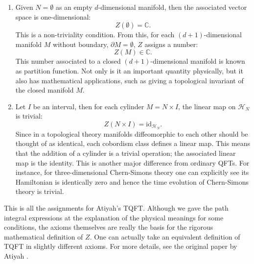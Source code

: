 \begin{enumerate}
  \item Given $N=\emptyset$ as an empty $d$-dimensional manifold, then the
associated vector space is one-dimensional:
\begin{equation}
  Z(\emptyset)  =  \mathbb{C}.
\end{equation}
This is a non-triviality condition. From this, for each $(d+1)$-dimensional
manifold $M$ without boundary, $\partial M=\emptyset$, $Z$ assigns
a number:
\begin{equation}
  Z(M)  \in  \mathbb{C}.
\end{equation}
This number associated to a closed $(d+1)$-dimensional manifold
is known as partition function. Not only is it an important quantity
physically, but it also has mathematical applications, such as giving
a topological invariant of the closed manifold $M$.
\item Let $I$ be an interval, then for each cylinder $M=N\times I$, the
linear map on $\mathcal{H}_{N}$ is trivial:
\begin{equation}
  Z(N\times I)  =  \mathrm{id}_{\mathcal{H}_{N}}.
\end{equation}
Since in a topological theory manifolds diffeomorphic to each other
should be thought of as identical, each cobordism class defines
a linear map. This means that the addition of a cylinder is a trivial
operation; the associated linear map is the identity. This
is another major difference from ordinary QFTs. For instance, for three-dimensional
Chern-Simons theory one can explicitly see its Hamiltonian is identically
zero and hence the time evolution of Chern-Simons theory is trivial.
\end{enumerate}
%
This is all the assignments for Atiyah's TQFT. Although we gave the
path integral expressions at the explanation of the physical meanings
for some conditions, the axioms themselves are really the basis for
the rigorous mathematical definition of $Z$. One can actually take
an equivalent definition of TQFT in slightly different axioms. For
more details, see the original paper by Atiyah \cite{Atiyah:1989vu}.

